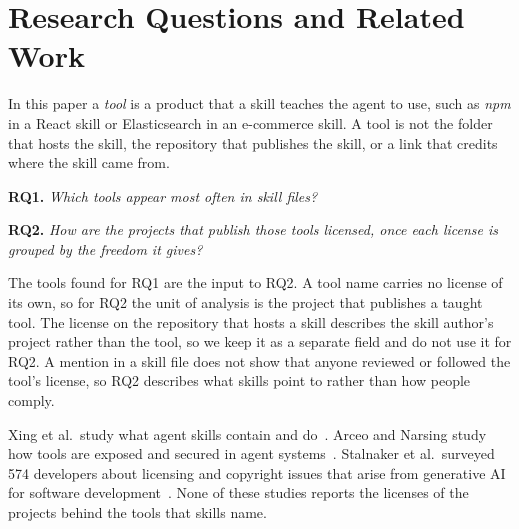 \section{Research Questions and Related Work}
\label{sec:rqs}

In this paper a \emph{tool} is a product that a skill teaches the agent to use, such as \textit{npm} in a React skill or Elasticsearch in an e-commerce skill.
A tool is not the folder that hosts the skill, the repository that publishes the skill, or a link that credits where the skill came from.

\noindent\textbf{RQ1.} \emph{Which tools appear most often in skill files?}

\noindent\textbf{RQ2.} \emph{How are the projects that publish those tools licensed, once each license is grouped by the freedom it gives?}

The tools found for RQ1 are the input to RQ2.
A tool name carries no license of its own, so for RQ2 the unit of analysis is the project that publishes a taught tool.
The license on the repository that hosts a skill describes the skill author's project rather than the tool, so we keep it as a separate field and do not use it for RQ2.
A mention in a skill file does not show that anyone reviewed or followed the tool's license, so RQ2 describes what skills point to rather than how people comply.

Xing et al.\ study what agent skills contain and do~\cite{10.1145/3770855.3818652}.
Arceo and Narsing study how tools are exposed and secured in agent systems~\cite{10.1145/3786335.3813145}.
Stalnaker et al.\ surveyed 574 developers about licensing and copyright issues that arise from generative AI for software development~\cite{stalnaker2026developerperspectives}.
None of these studies reports the licenses of the projects behind the tools that skills name.
